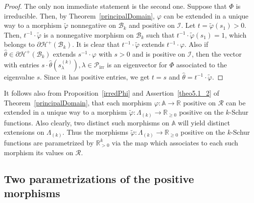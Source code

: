 \documentclass[ALCO,ThmDefs,Unicode,epreuves]{cedram}
\DeclareMathOperator{\irr}{irr}
\begin{document}
\begin{proof}
The only non immediate statement is the second one. Suppose that $\Phi$ is
irreducible. Then, by Theorem~\ref{principalDomain}, $\varphi$ can be extended
in a unique way to a morphism $\widetilde{\varphi}$ nonnegative on
$\mathcal{B}_{k}$ and positive on $\mathcal{I}$. Let $t=\widetilde{\varphi
}(s_{1})>0$. Then, $t^{-1}\cdot\widetilde{\varphi}$ is a nonnegative morphism
on $\mathcal{B}_{k}$ such that $t^{-1}\cdot\widetilde{\varphi}(s_{1})=1$,
which belongs to $\partial\mathcal{H}^{+}(\mathcal{B}_{k})$. It is clear that
$t^{-1}\cdot\widetilde{\varphi}$ extends $t^{-1}\cdot\varphi$. Also if
$\widehat{\theta}\in\partial\mathcal{H}^{+}(\mathcal{B}_{k})$ extends
$s^{-1}\cdot\varphi$ with $s>0$ and is positive on $\mathcal{I}$, then the
vector with entries $s\cdot\widehat{\theta}(s_{\lambda}^{(k)}),\lambda
\in\mathcal{P}_{\irr }$ is an eigenvector for $\Phi$ associated to the
eigenvalue $s$. Since it has positive entries, we get $t=s$ and $\widehat
{\theta}=t^{-1}\cdot\widetilde{\varphi}$.
\end{proof}

\begin{rema}
\label{Rem_param}It follows also from Proposition~\ref{irredPhi} and Assertion~\eqref{theo5.1_2}
 of Theorem~\ref{principalDomain}, that each morphism $\varphi:\mathbb{A}%
\rightarrow\mathbb{R}$ positive on $\mathcal{R}$ can be extended in a unique
way to a morphism $\widetilde{\varphi}:\Lambda_{(k)}\longrightarrow
\mathbb{R}_{\geq0}$ positive on the $k$-Schur functions. Also clearly, two
distinct such morphisms on $\mathbb{A}$ will yield distinct extensions on
$\Lambda_{(k)}$. Thus the morphisms $\widetilde{\varphi}:\Lambda
_{(k)}\longrightarrow\mathbb{R}_{\geq0}$ positive on the $k$-Schur functions
are parametrized by $\mathbb{R}_{>0}^{k}$ via the map which associates to each
such morphism its values on $\mathcal{R}$.
\end{rema}

\subsection{Two parametrizations of the positive morphisms}
\end{document}
